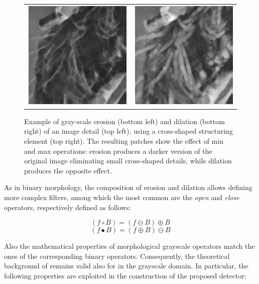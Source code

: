 \documentclass[review]{elsarticle}
\begin{document}
\begin{figure}[h!]
\begin{tabular}{cc}
		\includegraphics[scale=1]{eroded.eps} &  \includegraphics[scale=1]{dilated.eps} \\
	\end{tabular}
	\caption{Example of gray-scale erosion (bottom left) and dilation (bottom right) of an image detail (top left), using a cross-shaped structuring element (top right). The resulting patches show the effect of min and max operations: erosion produces a darker version of the original image eliminating small cross-shaped details, while dilation produces the opposite effect.}
\end{figure}

As in binary morphology, the composition of erosion and dilation allows defining more complex filters, among which the most common are the \textit{open} and \textit{close} operators, respectively defined as follows:

\begin{equation}
(f \circ B) = (f \ominus B) \oplus B
\end{equation}
\begin{equation}
(f \bullet B) = (f \oplus B) \ominus B
\end{equation}

Also the mathematical properties of morphological grayscale operators match the ones of the corresponding binary operators. Consequently, the theoretical background of \cite{de2017detecting} remains valid also for in the grayscale domain. In particular, the following properties are exploited in the construction of the proposed detector:
\end{document}
